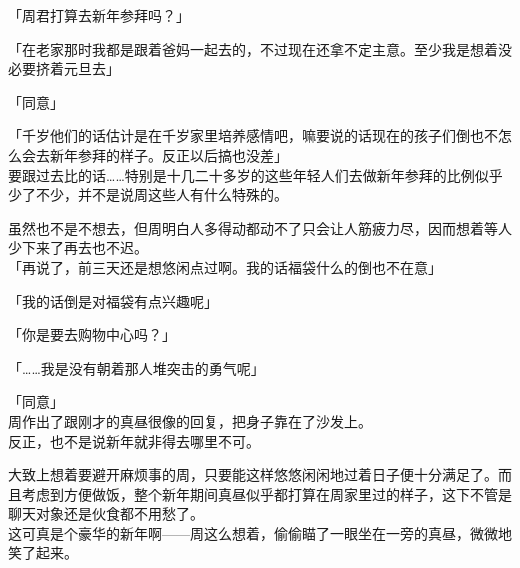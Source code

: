 「周君打算去新年参拜吗？」

「在老家那时我都是跟着爸妈一起去的，不过现在还拿不定主意。至少我是想着没必要挤着元旦去」

「同意」

「千岁他们的话估计是在千岁家里培养感情吧，嘛要说的话现在的孩子们倒也不怎么会去新年参拜的样子。反正以后搞也没差」\\

要跟过去比的话……特别是十几二十多岁的这些年轻人们去做新年参拜的比例似乎少了不少，并不是说周这些人有什么特殊的。

虽然也不是不想去，但周明白人多得动都动不了只会让人筋疲力尽，因而想着等人少下来了再去也不迟。\\

「再说了，前三天还是想悠闲点过啊。我的话福袋什么的倒也不在意」

「我的话倒是对福袋有点兴趣呢」

「你是要去购物中心吗？」

「……我是没有朝着那人堆突击的勇气呢」

「同意」\\

周作出了跟刚才的真昼很像的回复，把身子靠在了沙发上。\\

反正，也不是说新年就非得去哪里不可。

大致上想着要避开麻烦事的周，只要能这样悠悠闲闲地过着日子便十分满足了。而且考虑到方便做饭，整个新年期间真昼似乎都打算在周家里过的样子，这下不管是聊天对象还是伙食都不用愁了。\\

这可真是个豪华的新年啊——周这么想着，偷偷瞄了一眼坐在一旁的真昼，微微地笑了起来。
